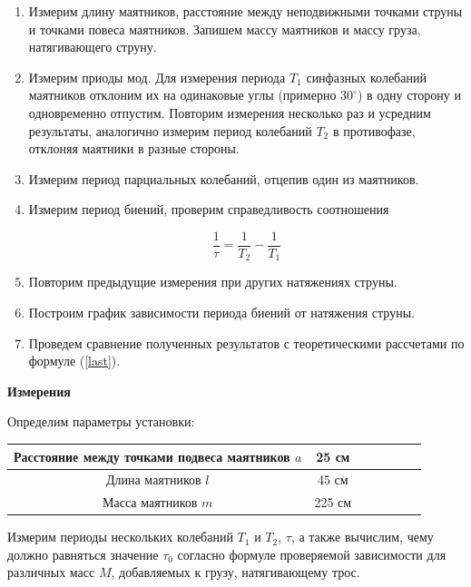 \documentclass[14pt]{article}
\begin{document}
\begin{flushleft}
\begin{enumerate}
\item Измерим длину маятников, расстояние между неподвижными точками струны и точками повеса маятников. Запишем массу маятников и массу груза, натягивающего струну.
\item Измерим приоды мод. Для измерения периода $T_1$ синфазных колебаний маятников отклоним их на одинаковые углы (примерно $30^{\circ}$) в одну сторону и одновременно отпустим. Повторим измерения несколько раз и усредним результаты, аналогично измерим период колебаний $T_2$ в противофазе, отклоняя маятники в разные стороны.
\item Измерим период парциальных колебаний, отцепив один из маятников.
\item Измерим период биений, проверим справедливость соотношения

$$
	\frac{1}{\tau} = \frac{1}{T_2} - \frac{1}{T_1}
$$

\item Повторим предыдущие измерения при других натяжениях струны.
\item Построим график зависимости периода биений от натяжения струны.
\item Проведем сравнение полученных результатов с теоретическими рассчетами по формуле (\ref{last}).
\end{enumerate}
\end{flushleft}

\newpage
\textbf{Измерения}
\vspace{1cm}

Определим параметры установки:

\begin{center}
\begin{tabular}{|c|c|c|c|c|c|c|}
\hline
Расстояние между точками подвеса маятников $a$		&	25	см	\\
\hline
Длина маятников $l$									&	45	см	\\
\hline
Масса маятников $m$									&	225	см	\\
\hline
\end{tabular}
\end{center}

Измерим периоды нескольких колебаний $T_1$ и $T_2$, $\tau$, а также вычислим, чему должно равняться значение $\tau_0$ согласно формуле проверяемой зависимости для различных масс $M$, добавляемых к грузу, натягивающему трос.
\end{document}
